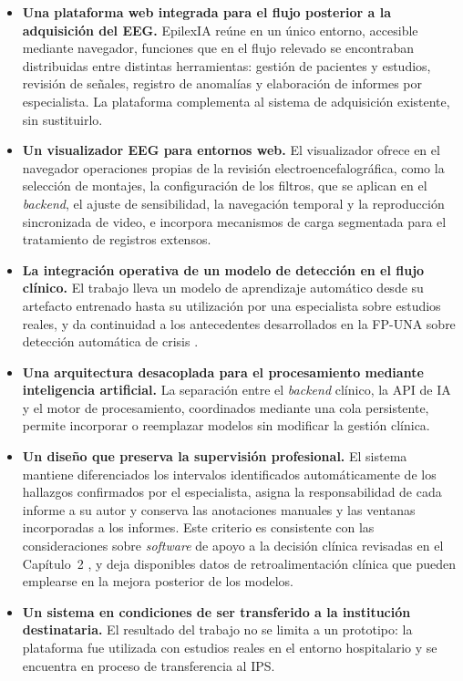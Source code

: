 \begin{itemize}
    \item \textbf{Una plataforma web integrada para el flujo posterior a la adquisición del EEG.}
    EpilexIA reúne en un único entorno, accesible mediante navegador, funciones que en el flujo relevado se encontraban distribuidas entre distintas herramientas: gestión de pacientes y estudios, revisión de señales, registro de anomalías y elaboración de informes por especialista.
    La plataforma complementa al sistema de adquisición existente, sin sustituirlo.

    \item \textbf{Un visualizador EEG para entornos web.}
    El visualizador ofrece en el navegador operaciones propias de la revisión electroencefalográfica, como la selección de montajes, la configuración de los filtros, que se aplican en el \textit{backend}, el ajuste de sensibilidad, la navegación temporal y la reproducción sincronizada de video, e incorpora mecanismos de carga segmentada para el tratamiento de registros extensos.

    \item \textbf{La integración operativa de un modelo de detección en el flujo clínico.}
    El trabajo lleva un modelo de aprendizaje automático desde su artefacto entrenado hasta su utilización por una especialista sobre estudios reales, y da continuidad a los antecedentes desarrollados en la FP-UNA sobre detección automática de crisis \citep{AyalaBritez2026SeizureDetection,Lezcano2026GradientBoosting}.

    \item \textbf{Una arquitectura desacoplada para el procesamiento mediante inteligencia artificial.}
    La separación entre el \textit{backend} clínico, la API de IA y el motor de procesamiento, coordinados mediante una cola persistente, permite incorporar o reemplazar modelos sin modificar la gestión clínica.

    \item \textbf{Un diseño que preserva la supervisión profesional.}
    El sistema mantiene diferenciados los intervalos identificados automáticamente de los hallazgos confirmados por el especialista, asigna la responsabilidad de cada informe a su autor y conserva las anotaciones manuales y las ventanas incorporadas a los informes.
    Este criterio es consistente con las consideraciones sobre \textit{software} de apoyo a la decisión clínica revisadas en el Capítulo~2 \citep{IMDRF2013SaMD,FDA2026CDS}, y deja disponibles datos de retroalimentación clínica que pueden emplearse en la mejora posterior de los modelos.

    \item \textbf{Un sistema en condiciones de ser transferido a la institución destinataria.}
    El resultado del trabajo no se limita a un prototipo: la plataforma fue utilizada con estudios reales en el entorno hospitalario y se encuentra en proceso de transferencia al IPS.
\end{itemize}


